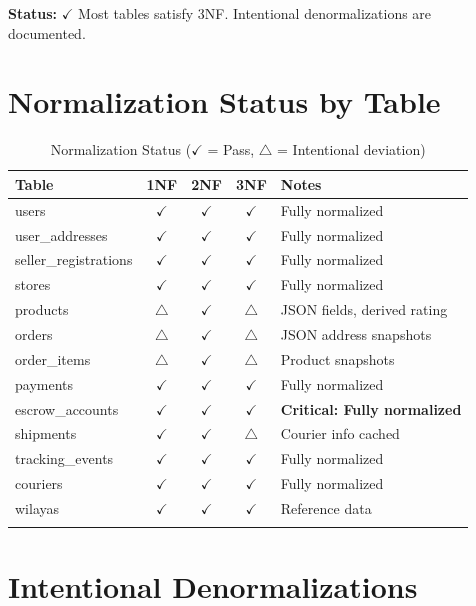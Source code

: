\documentclass[12pt,a4paper]{report}
\begin{document}
\textbf{Status:} $\checkmark$ Most tables satisfy 3NF. Intentional denormalizations are documented.

\section{Normalization Status by Table}

\begin{longtable}{lcccp{4cm}}
\toprule
\textbf{Table} & \textbf{1NF} & \textbf{2NF} & \textbf{3NF} & \textbf{Notes} \\
\midrule
\endhead
users & $\checkmark$ & $\checkmark$ & $\checkmark$ & Fully normalized \\
user\_addresses & $\checkmark$ & $\checkmark$ & $\checkmark$ & Fully normalized \\
seller\_registrations & $\checkmark$ & $\checkmark$ & $\checkmark$ & Fully normalized \\
stores & $\checkmark$ & $\checkmark$ & $\checkmark$ & Fully normalized \\
products & $\triangle$ & $\checkmark$ & $\triangle$ & JSON fields, derived rating \\
orders & $\triangle$ & $\checkmark$ & $\triangle$ & JSON address snapshots \\
order\_items & $\triangle$ & $\checkmark$ & $\triangle$ & Product snapshots \\
payments & $\checkmark$ & $\checkmark$ & $\checkmark$ & Fully normalized \\
escrow\_accounts & $\checkmark$ & $\checkmark$ & $\checkmark$ & \textbf{Critical: Fully normalized} \\
shipments & $\checkmark$ & $\checkmark$ & $\triangle$ & Courier info cached \\
tracking\_events & $\checkmark$ & $\checkmark$ & $\checkmark$ & Fully normalized \\
couriers & $\checkmark$ & $\checkmark$ & $\checkmark$ & Fully normalized \\
wilayas & $\checkmark$ & $\checkmark$ & $\checkmark$ & Reference data \\
\bottomrule
\caption{Normalization Status ($\checkmark$ = Pass, $\triangle$ = Intentional deviation)}
\end{longtable}

\section{Intentional Denormalizations}
\end{document}
